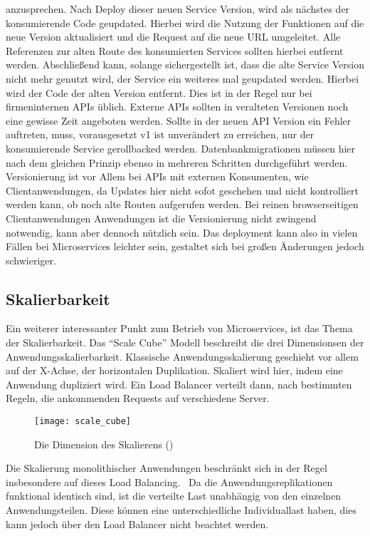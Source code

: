 \noindent anzusprechen. Nach Deploy dieser neuen Service Version, wird als nächstes der konsumierende Code geupdated. Hierbei wird die Nutzung der Funktionen auf die neue Version aktualisiert und die Request auf die neue URL umgeleitet. Alle Referenzen zur alten Route des konsumierten Services sollten hierbei entfernt werden. Abschließend kann, solange sichergestellt ist, dass die alte Service Version nicht mehr genutzt wird, der Service ein weiteres mal geupdated werden. Hierbei wird der Code der alten Version entfernt. Dies ist in der Regel nur bei firmeninternen APIs üblich. Externe APIs sollten in veralteten Versionen noch eine gewisse Zeit angeboten werden. Sollte in der neuen API Version ein Fehler auftreten, muss, vorausgesetzt v1 ist unverändert zu erreichen, nur der konsumierende Service gerollbacked werden.
Datenbankmigrationen müssen hier nach dem gleichen Prinzip ebenso in mehreren Schritten durchgeführt werden.
Versionierung ist vor Allem bei APIs mit externen Konsumenten, wie Clientanwendungen, da Updates hier nicht sofot geschehen und nicht kontrolliert werden kann, ob noch alte Routen aufgerufen werden. Bei reinen browserseitigen Clientanwendungen Anwendungen ist die Versionierung nicht zwingend notwendig, kann aber dennoch nützlich sein.
Das deployment kann also in vielen Fällen bei Microservices leichter sein, gestaltet sich bei großen Änderungen jedoch schwieriger.

\subsection{Skalierbarkeit}
Ein weiterer interessanter Punkt zum Betrieb von Microservices, ist das Thema der Skalierbarkeit.
Das ``Scale Cube''\cite[][]{abbott2009art} Modell beschreibt die drei Dimensionsen der Anwendungsskalierbarkeit. Klassische Anwendungsskalierung geschieht vor allem auf der X-Achse, der horizontalen Duplikation\cite[][]{abbott2009art}. Skaliert wird hier, indem eine Anwendung dupliziert wird. Ein Load Balancer verteilt dann, nach bestimmten Regeln, die ankommenden Requests auf verschiedene Server.~\cite[vgl.][]{loadbalancing} 

\begin{figure}[!ht]
    \caption{Die Dimension des Skalierens (\cite{abbott2009art})}
    \label{fig:scalecube}
    \texttt{[image: scale\_cube]}
\end{figure}

Die Skalierung monolithischer Anwendungen beschränkt sich in der Regel insbesondere auf dieses Load Balancing.~\cite[vgl.][]{infaktuell} 
Da die Anwendungsreplikationen funktional identisch sind, ist die verteilte Last unabhängig von den einzelnen Anwendungsteilen. Diese können eine unterschiedliche Individuallast haben, dies kann jedoch über den Load Balancer nicht beachtet werden.

